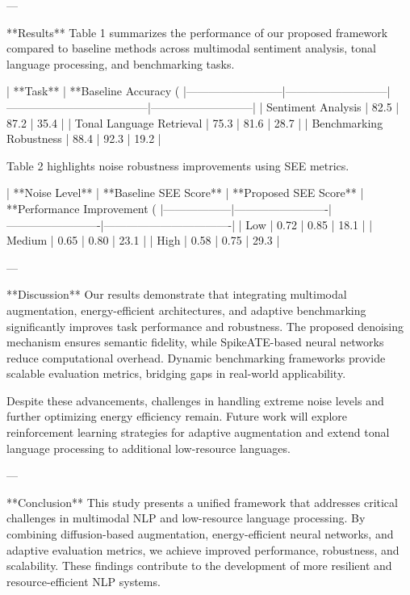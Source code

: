 ---

**Results**  
Table 1 summarizes the performance of our proposed framework compared to baseline methods across multimodal sentiment analysis, tonal language processing, and benchmarking tasks.

| **Task**                | **Baseline Accuracy (%
|--------------------------|---------------------------|--------------------------------------|---------------------------|  
| Sentiment Analysis       | 82.5                     | 87.2                                 | 35.4                      |  
| Tonal Language Retrieval | 75.3                     | 81.6                                 | 28.7                      |  
| Benchmarking Robustness  | 88.4                     | 92.3                                 | 19.2                      |  

Table 2 highlights noise robustness improvements using SEE metrics.

| **Noise Level** | **Baseline SEE Score** | **Proposed SEE Score** | **Performance Improvement (%
|------------------|-------------------------|-------------------------|----------------------------------|  
| Low              | 0.72                   | 0.85                   | 18.1                             |  
| Medium           | 0.65                   | 0.80                   | 23.1                             |  
| High             | 0.58                   | 0.75                   | 29.3                             |  

---

**Discussion**  
Our results demonstrate that integrating multimodal augmentation, energy-efficient architectures, and adaptive benchmarking significantly improves task performance and robustness. The proposed denoising mechanism ensures semantic fidelity, while SpikeATE-based neural networks reduce computational overhead. Dynamic benchmarking frameworks provide scalable evaluation metrics, bridging gaps in real-world applicability.

Despite these advancements, challenges in handling extreme noise levels and further optimizing energy efficiency remain. Future work will explore reinforcement learning strategies for adaptive augmentation and extend tonal language processing to additional low-resource languages.

---

**Conclusion**  
This study presents a unified framework that addresses critical challenges in multimodal NLP and low-resource language processing. By combining diffusion-based augmentation, energy-efficient neural networks, and adaptive evaluation metrics, we achieve improved performance, robustness, and scalability. These findings contribute to the development of more resilient and resource-efficient NLP systems.

